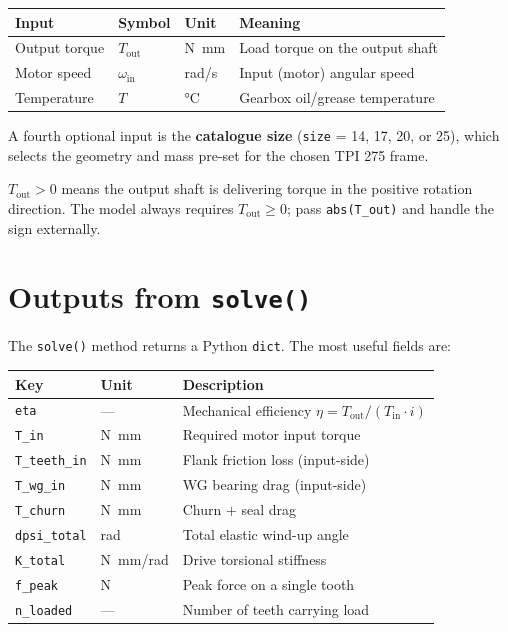 \documentclass[11pt,a4paper]{article}
\begin{document}
\bigskip
\begin{center}
\begin{tabular}{llll}
\toprule
Input & Symbol & Unit & Meaning \\
\midrule
Output torque & \(T_\text{out}\) & \si{N.mm} & Load torque on the output shaft \\
Motor speed   & \(\omega_\text{in}\) & \si{rad/s} & Input (motor) angular speed \\
Temperature   & \(T\)           & \si{\degreeCelsius} & Gearbox oil/grease temperature \\
\bottomrule
\end{tabular}
\end{center}

\bigskip
\noindent A fourth optional input is the \textbf{catalogue size}
(\texttt{size} = 14, 17, 20, or 25), which selects the geometry and
mass pre-set for the chosen TPI 275 frame.

\begin{keyresult}
\(T_\text{out} > 0\) means the output shaft is delivering torque in the
positive rotation direction.  The model always requires
\(T_\text{out} \geq 0\); pass \texttt{abs(T\_out)} and handle the sign
externally.
\end{keyresult}

\section{Outputs from \texttt{solve()}}

The \texttt{solve()} method returns a Python \texttt{dict}.
The most useful fields are:

\bigskip
\begin{center}
\begin{tabular}{lll}
\toprule
Key & Unit & Description \\
\midrule
\texttt{eta}         & —          & Mechanical efficiency \(\eta = T_\text{out} / (T_\text{in} \cdot i)\) \\
\texttt{T\_in}       & \si{N.mm}  & Required motor input torque \\
\texttt{T\_teeth\_in}& \si{N.mm}  & Flank friction loss (input-side) \\
\texttt{T\_wg\_in}   & \si{N.mm}  & WG bearing drag (input-side) \\
\texttt{T\_churn}    & \si{N.mm}  & Churn + seal drag \\
\texttt{dpsi\_total} & \si{rad}   & Total elastic wind-up angle \\
\texttt{K\_total}    & \si{N.mm/rad} & Drive torsional stiffness \\
\texttt{f\_peak}     & \si{N}     & Peak force on a single tooth \\
\texttt{n\_loaded}   & —          & Number of teeth carrying load \\
\bottomrule
\end{tabular}
\end{center}
\end{document}
